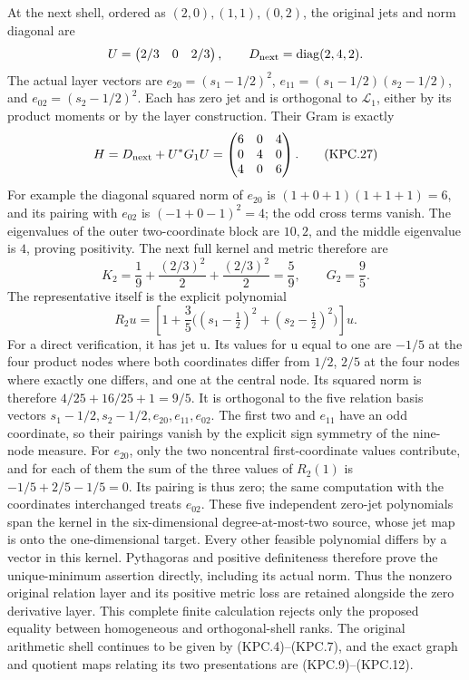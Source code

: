 At the next shell, ordered as \((2,0),(1,1),(0,2)\),
the original jets and norm diagonal are
\[
 U=\begin{pmatrix}2/3&0&2/3\end{pmatrix},\qquad
 D_{\rm next}=\operatorname{diag}(2,4,2).
\]
The actual layer vectors are
\(e_{20}=(s_1-1/2)^2\),
\(e_{11}=(s_1-1/2)(s_2-1/2)\), and
\(e_{02}=(s_2-1/2)^2\).  Each has zero jet and is
orthogonal to \(\mathcal L_1\), either by its product
moments or by the layer construction.  Their Gram is exactly
\[
 H=D_{\rm next}+U^*G_1U
   =\begin{pmatrix}6&0&4\\0&4&0\\4&0&6\end{pmatrix}.
 \tag{KPC.27}
\]
For example the diagonal squared norm of \(e_{20}\) is
\((1+0+1)(1+1+1)=6\), and its pairing with \(e_{02}\)
is \((-1+0-1)^2=4\); the odd cross terms vanish.
The eigenvalues of the outer two-coordinate block are \(10,2\),
and the middle eigenvalue is \(4\), proving positivity.
The next full kernel and metric therefore are
\[
 K_2=\frac19+\frac{(2/3)^2}{2}
                  +\frac{(2/3)^2}{2}=\frac59,
 \qquad G_2=\frac95.
 \tag{KPC.28}
\]
The representative itself is the explicit polynomial
\[
 R_2u=\left[1+\frac35
       \bigl((s_1-\tfrac12)^2+(s_2-\tfrac12)^2\bigr)\right]u.
 \tag{KPC.28a}
\]
For a direct verification, it has jet u.  Its values for u equal
to one are \(-1/5\) at the four product nodes where both
coordinates differ from \(1/2\), \(2/5\) at the four
nodes where exactly one differs, and one at the central node.
Its squared norm is therefore
\(4/25+16/25+1=9/5\).  It is orthogonal to the five
relation basis vectors
\(s_1-1/2,s_2-1/2,e_{20},e_{11},e_{02}\).
The first two and \(e_{11}\) have an odd coordinate, so
their pairings vanish by the explicit sign symmetry of the
nine-node measure.  For \(e_{20}\), only the two noncentral
first-coordinate values contribute, and for each of them the
sum of the three values of \(R_2(1)\) is
\(-1/5+2/5-1/5=0\).  Its pairing is thus zero; the
same computation with the coordinates interchanged treats
\(e_{02}\).  These five independent zero-jet polynomials
span the kernel in the six-dimensional degree-at-most-two
source, whose jet map is onto the one-dimensional target.
Every other feasible polynomial differs by a vector in this
kernel.  Pythagoras and positive definiteness therefore prove
the unique-minimum assertion directly, including its actual norm.
Thus the nonzero original relation layer and its positive metric
loss are retained alongside the zero derivative layer.  This
complete finite calculation rejects only the proposed equality
between homogeneous and orthogonal-shell ranks.  The original
arithmetic shell continues to be given by (KPC.4)--(KPC.7),
and the exact graph and quotient maps relating its two presentations
are (KPC.9)--(KPC.12).

